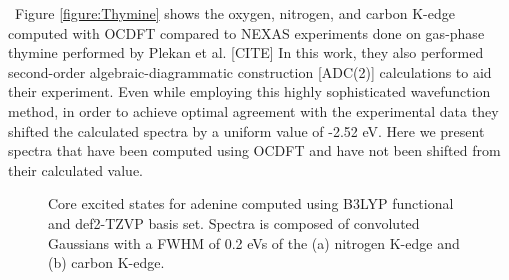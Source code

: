 \documentclass[12pt]{article}
\begin{document}

 \ Figure \ref{figure:Thymine} shows the oxygen, nitrogen, and carbon K-edge computed with OCDFT compared to NEXAS experiments done on gas-phase thymine performed by Plekan et al. [CITE] In this work, they also performed second-order algebraic-diagrammatic construction [ADC(2)] calculations to aid their experiment. Even while employing this highly sophisticated wavefunction method, in order to achieve optimal agreement with the experimental data they shifted the calculated spectra by a uniform value of -2.52 eV. Here we present spectra that have been computed using OCDFT and have not been shifted from their calculated value.
\begin{figure}[!ht]
\caption{Core excited states for adenine computed using B3LYP functional and def2-TZVP basis set. Spectra is composed of convoluted Gaussians with a FWHM of 0.2 eVs of the (a) nitrogen K-edge and (b) carbon K-edge.}
\label{figure:Adenine}
\end{figure}
\end{document}
